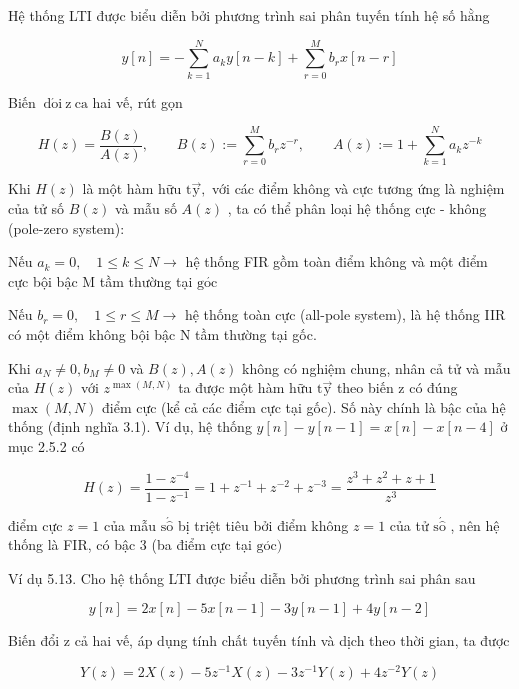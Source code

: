 \documentclass[
  10
]{article}
\begin{document}
Hệ thống LTI được biểu diễn bởi phương trình sai phân tuyến tính hệ số
hằng

\[
y [ n ] = - \sum_ {k = 1} ^ {N} a _ {k} y [ n - k ] + \sum_ {r = 0} ^ {M} b _ {r} x [ n - r ]
\]

Biến \(\mathrm { \ d } \mathrm { \acute { o } i \ z \ c a }\) hai vế,
rút gọn

\[
H (z) = \frac {B (z)}{A (z)}, \qquad B (z) := \sum_ {r = 0} ^ {M} b _ {r} z ^ {- r}, \qquad A (z) := 1 + \sum_ {k = 1} ^ {N} a _ {k} z ^ {- k}
\]

Khi \(H ( z )\) là một hàm hữu \(\mathrm { t { \vec { y } } , }\) với
các điểm không và cực tương ứng là nghiệm của tử số \(B ( z )\) và mẫu
số \(A ( z )\) , ta có thể phân loại hệ thống cực - không (pole-zero
system):

Nếu \(a _ { k } = 0 , \quad 1 \leq k \leq N \to\) hệ thống FIR gồm toàn
điểm không và một điểm cực bội bậc M tầm thường tại
\(\mathrm { g } \acute { \mathrm { o c } }\)

Nếu \(b _ { r } = 0 , \quad 1 \leq r \leq M \to\) hệ thống toàn cực
(all-pole system), là hệ thống IIR có một điểm không bội bậc N tầm
thường tại gốc.

Khi \(a _ { N } \neq 0 , b _ { M } \neq 0\) và \(B ( z ) , A ( z )\)
không có nghiệm chung, nhân cả tử và mẫu của \(H ( z )\) với
\(z ^ { \operatorname* { m a x } ( M , N ) }\) ta được một hàm hữu
\(\mathrm { t \vec { y } }\) theo biến z có đúng
\(\operatorname* { m a x } ( M , N )\) điểm cực (kể cả các điểm cực tại
gốc). Số này chính là bậc của hệ thống (định nghĩa 3.1). Ví dụ, hệ thống
\(y [ n ] - y [ n - 1 ] = x [ n ] - x [ n - 4 ]\) ở mục 2.5.2 có

\[
H (z) = \frac {1 - z ^ {- 4}}{1 - z ^ {- 1}} = 1 + z ^ {- 1} + z ^ {- 2} + z ^ {- 3} = \frac {z ^ {3} + z ^ {2} + z + 1}{z ^ {3}}
\]

điểm cực \(z = 1\) của mẫu
\(\mathrm { s } \acute { \hat { \mathrm { o } } }\) bị triệt tiêu bởi
điểm không \(z = 1\) của tử
\(\mathrm { s } \acute { \hat { \mathrm { o } } }\) , nên hệ thống là
FIR, có bậc 3 (ba điểm cực tại
\(\mathrm { g } \acute { \mathrm { o c } } )\)

Ví dụ 5.13. Cho hệ thống LTI được biểu diễn bởi phương trình sai phân
sau

\[
y [ n ] = 2 x [ n ] - 5 x [ n - 1 ] - 3 y [ n - 1 ] + 4 y [ n - 2 ]
\]

Biến đổi z cả hai vế, áp dụng tính chất tuyến tính và dịch theo thời
gian, ta được

\[
Y (z) = 2 X (z) - 5 z ^ {- 1} X (z) - 3 z ^ {- 1} Y (z) + 4 z ^ {- 2} Y (z)
\]
\end{document}
